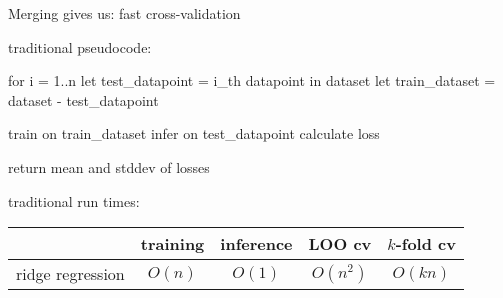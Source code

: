 \begin{frame}[fragile]{Merging gives us: fast cross-validation}

traditional pseudocode:
\begin{code}
for i = 1..n
    let test_datapoint = i_th datapoint in dataset
    let train_dataset  = dataset - test_datapoint

    train on train_dataset  
    infer on test_datapoint
    calculate loss        

return mean and stddev of losses
\end{code}


\vspace{0.1in}
traditional run times:
\vspace{0.1in}

\centering
\begin{tabular}{l|cc|cc}
& training & inference & LOO cv & $k$-fold cv \\ %
\hline
ridge regression & $O(n)$ & $O(1)$ & $O(n^2)$ & $O(kn)$ \\
\end{tabular}

\end{frame}

